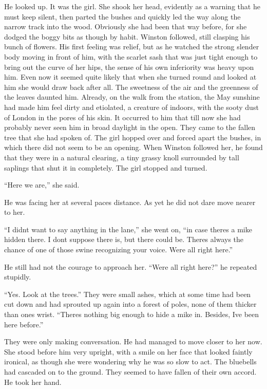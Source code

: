 He looked up. It was the girl. She shook her head, evidently as a
warning that he must keep silent, then parted the bushes and quickly led
the way along the narrow track into the wood. Obviously she had been
that way before, for she dodged the boggy bits as though by habit.
Winston followed, still clasping his bunch of flowers. His first feeling
was relief, but as he watched the strong slender body moving in front of
him, with the scarlet sash that was just tight enough to bring out the
curve of her hips, the sense of his own inferiority was heavy upon him.
Even now it seemed quite likely that when she turned round and looked at
him she would draw back after all. The sweetness of the air and the
greenness of the leaves daunted him. Already, on the walk from the
station, the May sunshine had made him feel dirty and etiolated, a
creature of indoors, with the sooty dust of London in the pores of his
skin. It occurred to him that till now she had probably never seen him
in broad daylight in the open. They came to the fallen tree that she had
spoken of. The girl hopped over and forced apart the bushes, in which
there did not seem to be an opening. When Winston followed her, he found
that they were in a natural clearing, a tiny grassy knoll surrounded by
tall saplings that shut it in completely. The girl stopped and turned.

``Here we are,'' she said.

He was facing her at several paces\textquotesingle{} distance. As yet he
did not dare move nearer to her.

``I didn\textquotesingle t want to say anything in the lane,'' she went
on, ``in case there\textquotesingle s a mike hidden there. I
don\textquotesingle t suppose there is, but there could be.
There\textquotesingle s always the chance of one of those swine
recognizing your voice. We\textquotesingle re all right here.''

He still had not the courage to approach her. ``We\textquotesingle re all
right here?'' he repeated stupidly.

``Yes. Look at the trees.'' They were small ashes, which at some time had
been cut down and had sprouted up again into a forest of poles, none of
them thicker than one\textquotesingle s wrist. ``There\textquotesingle s
nothing big enough to hide a mike in. Besides, I\textquotesingle ve been
here before.''

They were only making conversation. He had managed to move closer to her
now. She stood before him very upright, with a smile on her face that
looked faintly ironical, as though she were wondering why he was so slow
to act. The bluebells had cascaded on to the ground. They seemed to have
fallen of their own accord. He took her hand.

